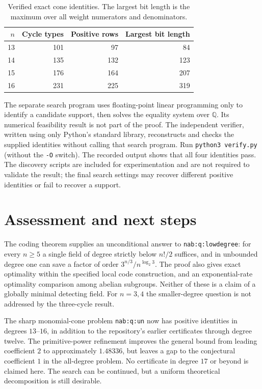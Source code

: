 \documentclass[11pt]{article}
\theoremstyle{remark}\newtheorem{remark}[theorem]{Remark}
\newcommand{\Q}{\mathbb Q}
\begin{document}
\begin{table}[ht]
\centering
\caption{Verified exact cone identities. The largest bit length is the maximum over all weight numerators and denominators.}
\begin{tabular}{rrrr}
\toprule
$n$&Cycle types&Positive rows&Largest bit length\\
\midrule
13&101&97&84\\
14&135&132&123\\
15&176&164&207\\
16&231&225&319\\
\bottomrule
\end{tabular}
\end{table}
The separate search program uses floating-point linear programming only to identify a candidate support, then solves the equality system over $\Q$. Its numerical feasibility result is not part of the proof. The independent verifier, written using only Python's standard library, reconstructs and checks the supplied identities without calling that search program. Run \texttt{python3 verify.py} (without the \texttt{-O} switch). The recorded output shows that all four identities pass. The discovery scripts are included for experimentation and are not required to validate the result; the final search settings may recover different positive identities or fail to recover a support.

\section{Assessment and next steps}
The coding theorem supplies an unconditional answer to \texttt{nab:q:lowdegree}: for every $n\ge5$ a single field of degree strictly below $n!/2$ suffices, and in unbounded degree one can save a factor of order $3^{n/3}/n^{\log_2 3}$. The proof also gives exact optimality within the specified local code construction, and an exponential-rate optimality comparison among abelian subgroups. Neither of these is a claim of a globally minimal detecting field. For $n=3,4$ the smaller-degree question is not addressed by the three-cycle result.

The sharp monomial-cone problem \texttt{nab:q:un} now has positive identities in degrees $13$--$16$, in addition to the repository's earlier certificates through degree twelve. The primitive-power refinement improves the general bound from leading coefficient $2$ to approximately $1.48336$, but leaves a gap to the conjectural coefficient $1$ in the all-degree problem. No certificate in degree $17$ or beyond is claimed here. The search can be continued, but a uniform theoretical decomposition is still desirable.
\end{document}

